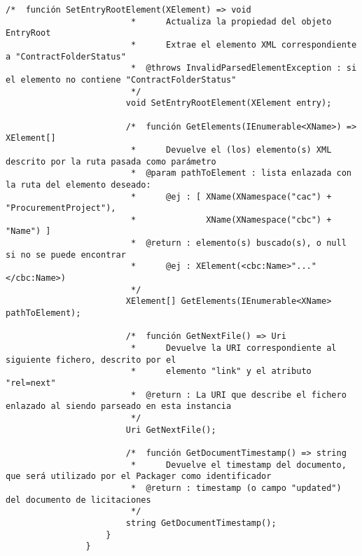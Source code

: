 \begin{lstlisting}[language=lCSharp]
                        /*  función SetEntryRootElement(XElement) => void
                         *      Actualiza la propiedad del objeto EntryRoot
                         *      Extrae el elemento XML correspondiente a "ContractFolderStatus"
                         *  @throws InvalidParsedElementException : si el elemento no contiene "ContractFolderStatus"
                         */
                        void SetEntryRootElement(XElement entry);
                
                        /*  función GetElements(IEnumerable<XName>) => XElement[]
                         *      Devuelve el (los) elemento(s) XML descrito por la ruta pasada como parámetro
                         *  @param pathToElement : lista enlazada con la ruta del elemento deseado:
                         *      @ej : [ XName(XNamespace("cac") + "ProcurementProject"),
                         *              XName(XNamespace("cbc") + "Name") ]
                         *  @return : elemento(s) buscado(s), o null si no se puede encontrar
                         *      @ej : XElement(<cbc:Name>"..."</cbc:Name>)
                         */
                        XElement[] GetElements(IEnumerable<XName> pathToElement);
                
                        /*  función GetNextFile() => Uri
                         *      Devuelve la URI correspondiente al siguiente fichero, descrito por el
                         *      elemento "link" y el atributo "rel=next"
                         *  @return : La URI que describe el fichero enlazado al siendo parseado en esta instancia
                         */
                        Uri GetNextFile();
                
                        /*  función GetDocumentTimestamp() => string
                         *      Devuelve el timestamp del documento, que será utilizado por el Packager como identificador
                         *  @return : timestamp (o campo "updated") del documento de licitaciones
                         */
                        string GetDocumentTimestamp();
                    }
                }
            \end{lstlisting}
\newpage
